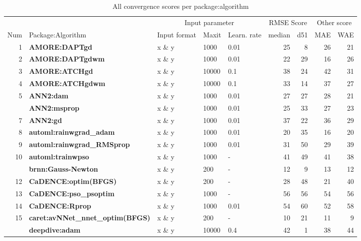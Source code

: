 \begin{Schunk}
\begin{table}

\caption{\label{tab:unnamed-chunk-3}All convergence scores per package:algorithm}
\centering
\fontsize{8}{10}\selectfont
\begin{tabular}[t]{r>{}llllrrrr}
\toprule
\multicolumn{2}{c}{ } & \multicolumn{3}{c}{Input parameter} & \multicolumn{2}{c}{RMSE Score} & \multicolumn{2}{c}{Other score} \\
\cmidrule(l{3pt}r{3pt}){3-5} \cmidrule(l{3pt}r{3pt}){6-7} \cmidrule(l{3pt}r{3pt}){8-9}
Num & Package:Algorithm & Input format & Maxit & Learn. rate & median & d51 & MAE & WAE\\
\midrule
1 & \textbf{AMORE:DAPTgd} & x \& y & 1000 & 0.01 & 25 & 8 & 26 & 21\\
2 & \textbf{AMORE:DAPTgdwm} & x \& y & 1000 & 0.01 & 22 & 29 & 16 & 26\\
3 & \textbf{AMORE:ATCHgd} & x \& y & 10000 & 0.1 & 38 & 24 & 42 & 31\\
4 & \textbf{AMORE:ATCHgdwm} & x \& y & 10000 & 0.1 & 33 & 14 & 37 & 27\\
5 & \textbf{ANN2:dam} & x \& y & 1000 & 0.01 & 27 & 27 & 28 & 21\\
\addlinespace
6 & \textbf{ANN2:msprop} & x \& y & 1000 & 0.01 & 25 & 33 & 27 & 23\\
7 & \textbf{ANN2:gd} & x \& y & 1000 & 0.01 & 37 & 22 & 36 & 29\\
8 & \textbf{automl:rainwgrad\_adam} & x \& y & 1000 & 0.01 & 20 & 35 & 16 & 20\\
9 & \textbf{automl:rainwgrad\_RMSprop} & x \& y & 1000 & 0.01 & 31 & 50 & 29 & 39\\
10 & \textbf{automl:trainwpso} & x \& y & 1000 & - & 41 & 49 & 41 & 38\\
\addlinespace
11 & \textbf{brnn:Gauss-Newton} & x \& y & 200 & - & 12 & 9 & 13 & 12\\
12 & \textbf{CaDENCE:optim(BFGS)} & x \& y & 200 & - & 28 & 48 & 21 & 40\\
13 & \textbf{CaDENCE:pso\_psoptim} & x \& y & 1000 & - & 56 & 56 & 54 & 56\\
14 & \textbf{CaDENCE:Rprop} & x \& y & 1000 & 0.01 & 54 & 60 & 52 & 58\\
15 & \textbf{caret:avNNet\_nnet\_optim(BFGS)} & x \& y & 200 & - & 10 & 21 & 11 & 9\\
\addlinespace
16 & \textbf{deepdive:adam} & x \& y & 10000 & 0.4 & 42 & 1 & 38 & 44\\

\end{tabular}
\end{table}
\end{Schunk}

